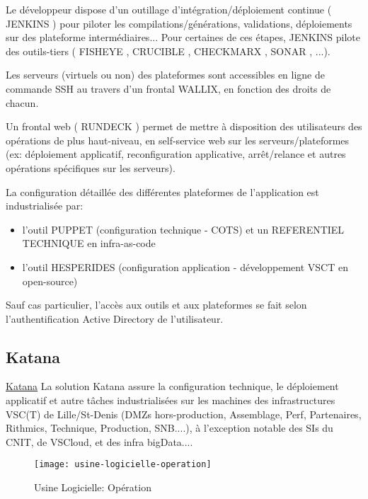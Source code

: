 Le développeur dispose d'un outillage d'intégration/déploiement continue ( JENKINS ) pour piloter les compilations/générations, validations, déploiements sur des plateforme intermédiaires...
Pour certaines de ces étapes, JENKINS pilote des outils-tiers ( FISHEYE , CRUCIBLE , CHECKMARX , SONAR , ...).

Les serveurs (virtuels ou non) des plateformes sont accessibles en ligne de commande SSH au travers d'un frontal WALLIX, en fonction des droits de chacun.

Un frontal web ( RUNDECK ) permet de mettre à disposition des utilisateurs des opérations de plus haut-niveau, en self-service web sur les serveurs/plateformes (ex: déploiement applicatif, reconfiguration applicative, arrêt/relance et autres opérations spécifiques sur les serveurs).

La configuration détaillée des différentes plateformes de l'application est industrialisée par:
\begin{itemize}
  \item l'outil PUPPET (configuration technique - COTS) et un REFERENTIEL TECHNIQUE en infra-as-code
  \item l'outil HESPERIDES (configuration application - développement VSCT en open-source)
\end{itemize}

Sauf cas particulier, l'accès aux outils et aux plateformes se fait selon l'authentification Active Directory de l'utilisateur.
\subsection{Katana}

\href{https://wiki.vsct.fr/display/KTN/KATANA+Accueil}{Katana}
La solution Katana assure la configuration technique, le déploiement applicatif et autre tâches industrialisées sur les machines des infrastructures VSC(T) de Lille/St-Denis (DMZs hors-production, Assemblage, Perf, Partenaires, Rithmics, Technique, Production, SNB....), à l'exception notable des SIs du CNIT, de VSCloud, et des infra bigData....

\begin{figure}[h]
\centering
\texttt{[image: usine-logicielle-operation]}
\caption{Usine Logicielle: Opération}
\end{figure}

